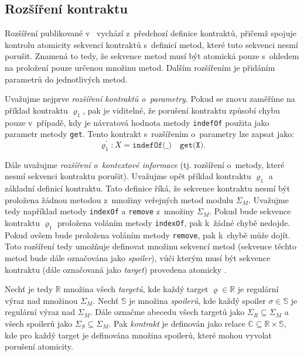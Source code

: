 \subsection{Rozšíření kontraktu}\label{contract-def-ext}

Rozšíření publikované v~\cite{cite:contract2} vychází z~předchozí definice kontraktů, přičemž spojuje kontrolu atomicity sekvencí kontraktů s~definicí metod, které tuto sekvenci nesmí porušit. Znamená to tedy, že sekvence metod musí být atomická pouze s~ohledem na proložení pouze určenou množinu metod. Dalším rozšířením je přidáním parametrů do jednotlivých metod. 

Uvažujme nejprve \textit{rozšíření kontraktů o~parametry}. Pokud se znovu zaměříme na příklad kontraktu $\varrho_1$, pak je viditelné, že porušení kontraktu způsobí chybu pouze v~případě, kdy je návratová hodnota metody \texttt{indefOf} použita jako parametr metody \texttt{get}. Tento kontrakt s~rozšířením o~parametry lze zapsat jako:
$$\varrho_1^\prime: X = \texttt{indefOf(\_)} \quad \texttt{get(X)}.$$

Dále uvažujme \textit{rozšíření o~kontextové informace} (tj. rozšíření o~metody, které nesmí sekvenci kontraktu porušit). Uvažujme opět příklad kontraktu $\varrho_1$ a základní definicí kontraktu. Tato definice říká, že sekvence kontraktu nesmí být proložena žádnou metodou z~množiny veřejných metod modulu $\Sigma_M$. Uvažujme tedy například metody \texttt{indexOf} a \texttt{remove} z~množiny $\Sigma_M$. Pokud bude sekvence kontraktu $\varrho_1$ proložena voláním metody \texttt{indexOf}, pak k~žádné chybě nedojde. Pokud ovšem bude proložena voláním metody \texttt{remove}, pak k~chybě může dojít. Toto rozšíření tedy umožňuje definovat množinu sekvencí metod (sekvence těchto metod bude dále označována jako \textit{spoiler}), vůči kterým musí být sekvence kontraktu (dále označovaná jako \textit{target}) provedena atomicky \cite{cite:contract2}.

Nechť je tedy $\mathbb{R}$ množina všech \textit{targetů}, kde každý target $\varrho \in \mathbb{R}$ je regulární výraz nad množinou $\Sigma_M$. Nechť $\mathbb{S}$ je množina \textit{spoilerů}, kde každý spoiler $\sigma \in \mathbb{S}$ je regulární výraz nad $\Sigma_M$. Dále označme abecedu všech targetů jako $\Sigma_R \subseteq \Sigma_M$ a všech spoilerů jako $\Sigma_S \subseteq \Sigma_M$. Pak \textit{kontrakt} je definován jako relace $\mathbb{C} \subseteq \mathbb{R} \times \mathbb{S}$, kde pro každý target je definována množina spoilerů, které mohou vyvolat porušení atomicity.

